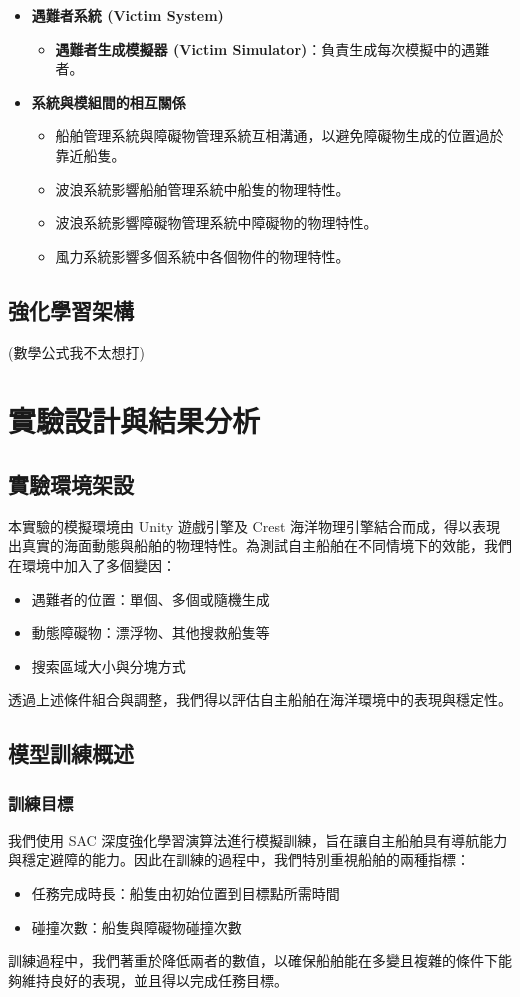 \documentclass[12pt,a4paper]{ctexart}
\begin{document}
\begin{itemize}
	 \item \textbf{遇難者系統 (Victim System)}
	\begin{itemize}
	    \item \textbf{遇難者生成模擬器 (Victim Simulator)}：負責生成每次模擬中的遇難者。
	\end{itemize}
	
	 \item \textbf{系統與模組間的相互關係}
	\begin{itemize}
	    \item 船舶管理系統與障礙物管理系統互相溝通，以避免障礙物生成的位置過於靠近船隻。
	    \item 波浪系統影響船舶管理系統中船隻的物理特性。
	    \item 波浪系統影響障礙物管理系統中障礙物的物理特性。
	    \item 風力系統影響多個系統中各個物件的物理特性。
	\end{itemize}

\end{itemize}

\subsection{強化學習架構}
(數學公式我不太想打)

\section{實驗設計與結果分析}

\subsection{實驗環境架設}
本實驗的模擬環境由 Unity 遊戲引擎及 Crest 海洋物理引擎結合而成，得以表現出真實的海面動態與船舶的物理特性。為測試自主船舶在不同情境下的效能，我們在環境中加入了多個變因：
\begin{itemize}
    \item 遇難者的位置：單個、多個或隨機生成
    \item 動態障礙物：漂浮物、其他搜救船隻等
    \item 搜索區域大小與分塊方式
\end{itemize}
透過上述條件組合與調整，我們得以評估自主船舶在海洋環境中的表現與穩定性。

\subsection{模型訓練概述}
\subsubsection{訓練目標}
我們使用 SAC 深度強化學習演算法進行模擬訓練，旨在讓自主船舶具有導航能力與穩定避障的能力。因此在訓練的過程中，我們特別重視船舶的兩種指標：
\begin{itemize}
    \item 任務完成時長：船隻由初始位置到目標點所需時間
    \item 碰撞次數：船隻與障礙物碰撞次數
\end{itemize}
訓練過程中，我們著重於降低兩者的數值，以確保船舶能在多變且複雜的條件下能夠維持良好的表現，並且得以完成任務目標。
\end{document}
